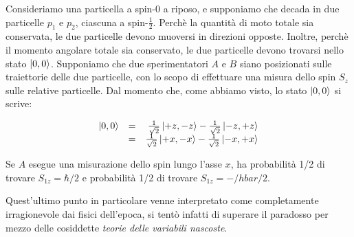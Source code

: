 	Consideriamo una particella a spin-0 a riposo, e supponiamo che decada in due particelle $p_1$ e $p_2$, ciascuna a spin-$\tfrac{1}{2}$. Perch\`e la quantit\`a di moto totale sia conservata, le due particelle devono muoversi in direzioni opposte. Inoltre, perch\`e il momento angolare totale sia conservato, le due particelle devono trovarsi nello stato $\ket{0, 0}$. Supponiamo che due sperimentatori $A$ e $B$ siano posizionati sulle traiettorie delle due particelle, con lo scopo di effettuare una misura dello spin $S_z$ sulle relative particelle.
Dal momento che, come abbiamo visto, lo stato $\ket{0, 0}$ si scrive:

	\[
		\begin{array}{l c r}
			\ket{0, 0} & = & \frac{1}{\sqrt{2}} \ket{+z, -z} - \frac{1}{\sqrt{2}} \ket{-z, +z} \\
			& = & \frac{1}{\sqrt{2}} \ket{+x, -x} - \frac{1}{\sqrt{2}} \ket{-x, +x}
		\end{array}
	\]

Se $A$ esegue una misurazione dello spin lungo l'asse $x$, ha probabilit\`a 1/2 di trovare $S_{1z} = \hbar / 2$ e probabilit\`a 1/2 di trovare $S_{1z} = - /hbar / 2$. 


Quest'ultimo punto in particolare venne interpretato come completamente irragionevole dai fisici dell'epoca, si tent\`o infatti di superare il paradosso per mezzo delle cosiddette \textit{teorie delle variabili nascoste}.

